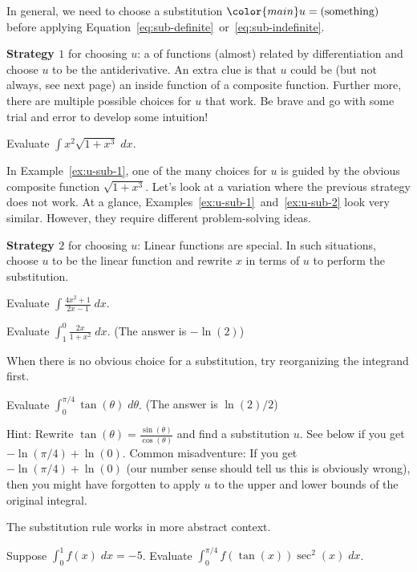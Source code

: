 \documentclass[../main.tex]{subfiles}
\begin{document}
  In general, we need to choose a substitution \(\color{main} u = (\text{something})\) before applying Equation~\eqref{eq:sub-definite}~or~\eqref{eq:sub-indefinite}.

  \textbf{Strategy \(1\)} for choosing \(u\):  a  of functions (almost) related by differentiation and choose \(u\) to be the antiderivative.  An extra clue is that \(u\) could be (but not always, see next page) an inside function of a composite function. Further more, there are multiple possible choices for \(u\) that work. Be brave and go with some trial and error to develop some intuition!
  \begin{example} \label{ex:u-sub-1}
    Evaluate \(\int x^{2} \sqrt{1 + x^{3}} \;dx\).
  \end{example}
  \clearpage

  In Example~\ref{ex:u-sub-1}, one of the many choices for \(u\) is guided by the obvious composite function \(\sqrt{1 + x^{3}}\). Let's look at a variation where the previous strategy does not work. At a glance, Examples~\ref{ex:u-sub-1}~and~\ref{ex:u-sub-2} look very similar. However, they require different problem-solving ideas.

  \textbf{Strategy \(2\)} for choosing \(u\): Linear functions are special. In such situations, choose \(u\) to be the linear function and rewrite \(x\) in terms of \(u\) to perform the substitution.
  \begin{example} \label{ex:u-sub-2}
    Evaluate \(\int \frac{4x^{2} + 1}{2x - 1} \;dx\).
  \end{example}

  \begin{example}
    Evaluate \(\int_{1}^{0} \frac{2x}{1 + x^{2}} \;dx\). \hfill{}{(The answer is \(-\ln(2)\))}
  \end{example}

  \clearpage
  When there is no obvious choice for a substitution, try reorganizing the integrand first.
  \begin{example}
    Evaluate \(\int_{0}^{\pi/4} \tan(\theta) \;d\theta\). \hfill{}{(The answer is \(\ln(2)/2\))}

    Hint: Rewrite \(\tan(\theta) = \frac{\sin(\theta)}{\cos(\theta)}\) and find a substitution \(u\). See below if you get \(-\ln(\pi/4) + \ln(0)\).
    Common misadventure: If you get \(-\ln(\pi/4) + \ln(0)\) (our number sense should tell us this is obviously wrong), then you might have forgotten to apply \(u\) to the upper and lower bounds of the original integral.
  \end{example}

  \medskip
  The substitution rule works in more abstract context.
  \begin{example}
    Suppose \(\int_{0}^{1} f(x) \;dx = -5\). Evaluate \(\int_{0}^{\pi/4} f(\tan(x)) \sec^{2}(x) \;dx\).
  \end{example}
\end{document}
